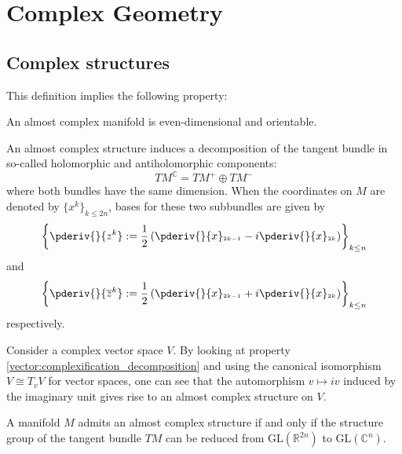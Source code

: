\chapter{Complex Geometry}\label{chapter:complex_geometry}

\section{Complex structures}


    This definition implies the following property:
    \begin{property}
        An almost complex manifold is even-dimensional and orientable.
    \end{property}

    An almost complex structure induces a decomposition of the tangent bundle in so-called holomorphic and antiholomorphic components:\[TM^{\mathbb{C}} = TM^+\oplus TM^-\] where both bundles have the same dimension. When the coordinates on $M$ are denoted by $\{x^k\}_{k\leq 2n}$, bases for these two subbundles are given by \[\left\{\pderiv{}{z^k} := \frac{1}{2}\left(\pderiv{}{x}_{^{2k-1}} - i\pderiv{}{x}_{^{2k}}\right)\right\}_{k\leq n}\] and \[\left\{\pderiv{}{\overline{z}^k} := \frac{1}{2}\left(\pderiv{}{x}_{^{2k-1}} + i\pderiv{}{x}_{^{2k}}\right)\right\}_{k\leq n}\] respectively.


    \begin{example}
        Consider a complex vector space $V$. By looking at property \ref{vector:complexification_decomposition} and using the canonical isomorphism $V\cong T_vV$ for vector spaces, one can see that the automorphism $v\mapsto iv$ induced by the imaginary unit gives rise to an almost complex structure on $V$.
    \end{example}

    \begin{property}
        A manifold $M$ admits an almost complex structure if and only if the structure group of the tangent bundle $TM$ can be reduced from $\text{GL}(\mathbb{R}^{2n})$ to $\text{GL}(\mathbb{C}^n)$.
    \end{property}

